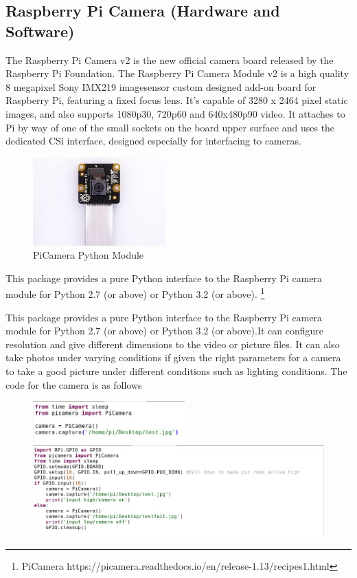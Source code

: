 \documentclass[a4paper,11pt]{report}
\begin{document}
	\subsection{Raspberry Pi Camera (Hardware and Software)}
	\par The Raspberry Pi Camera v2 is the new official camera board released by the Raspberry Pi Foundation. The Raspberry Pi Camera Module v2 is a high quality 8 megapixel Sony IMX219 imagesensor custom designed add-on board for Raspberry Pi, featuring a fixed focus lens. It's capable of 3280 x 2464 pixel static images, and also supports 1080p30, 720p60 and 640x480p90 video. It attaches to Pi by way of one of the small sockets on the board upper surface and uses the dedicated CSi interface, designed especially for interfacing to cameras.
	\begin{figure}[h]
		\centering
		\includegraphics[width=2in]{picam.jpg}
		\caption{PiCamera Python Module}
	\end{figure}
	\par This package provides a pure Python interface to the Raspberry Pi camera module for Python 2.7 (or above) or Python 3.2 (or above).
	\footnote{PiCamera https://picamera.readthedocs.io/en/release-1.13/recipes1.html}
	\par This package provides a pure Python interface to the Raspberry Pi camera module for Python 2.7 (or above) or Python 3.2 (or above).It can configure resolution and give different dimensions to the video or picture files. It can also take photos under varying conditions if given the right parameters for a camera to take a good picture under different conditions such as lighting conditions. 
	The code for the camera is as follows
	\begin{figure}
		\includegraphics[width=2.3in]{camcode1.jpg}\\
		\includegraphics[width=\textwidth]{camcode2.jpg}
	\end{figure}
	
\end{document}
